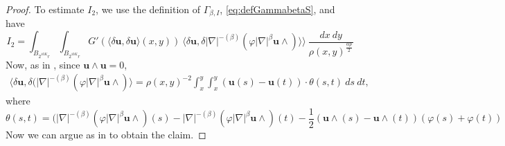 \documentclass[a4paper,10pt,intlimits,ngerman]{amsart}
\newcommand{\iv}{B} %
\numberwithin{equation}{section}
\newcommand{\solu}{{\boldsymbol{u}}}
\newcommand{\laps}[1]{|\nabla|^{#1}}
\newcommand{\lapms}[1]{|\nabla|^{-\brac{#1}}}
\newcommand{\brac}[1]{\left ( #1 \right )}
\newcommand{\dmv}[2]{\langle \delta #1, \delta #2\rangle}
\begin{document}
\begin{proof}
To estimate $I_2$, we use the definition of $\Gamma_{\beta,I}$, \eqref{eq:defGammabetaS}, and have
\[
 I_2 = \int_{\iv_{2^{10 K}r}}\int_{\iv_{2^{10 K}r}} G'(\dmv{\solu}{\solu}(x,y) )\ \dmv{\solu}{\lapms{\beta} (\varphi \laps{\beta} \solu\wedge)} \rangle\ \frac{dx\ dy}{\rho(x,y)^{\frac{\alpha p}{2}}}
\]
Now, as in \cite[(3.13)]{SchikorraCPDE14}, since $\solu\wedge \solu = 0$,
\[
\begin{split}
 \dmv{\solu}{(\lapms{\beta} (\varphi \laps{\beta} \solu \wedge)} = \rho(x,y)^{-2} \int_x^y \int_x^y (\solu(s)-\solu(t))\cdot \theta(s,t)\ ds\ dt,
 \end{split}
\]
where
\[
 \theta(s,t) = (\lapms{\beta} (\varphi \laps{\beta} \solu \wedge)(s) - \lapms{\beta} (\varphi \laps{\beta} \solu \wedge)(t) - \frac{1}{2} (\solu \wedge(s) - \solu \wedge(t))(\varphi(s)+\varphi(t))
\]
Now we can argue as in \cite[Lemma 6.6]{SchikorraCPDE14} to obtain the claim.

\end{proof}
\end{document}
